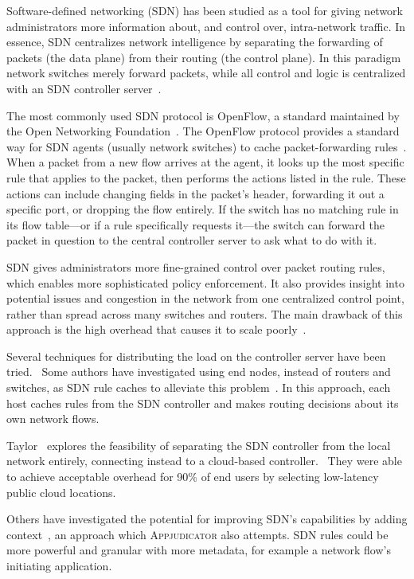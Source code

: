 Software-defined networking (SDN) has been studied as a tool for giving network
administrators more information about, and control over, intra-network traffic.
In essence, SDN centralizes network intelligence by separating the forwarding of
packets (the data plane) from their routing (the control plane). In this
paradigm network switches merely forward packets, while all control and logic is
centralized with an SDN controller server~\cite{kim2013}.

The most commonly used SDN protocol is OpenFlow, a standard maintained by the
Open Networking Foundation~\cite{erickson2011}. The OpenFlow protocol provides a
standard way for SDN agents (usually network switches) to cache
packet-forwarding rules~\cite{openflowspec}. When a packet from a new flow
arrives at the agent, it looks up the most specific rule that applies to the
packet, then performs the actions listed in the rule. These actions can include
changing fields in the packet's header, forwarding it out a specific port, or
dropping the flow entirely. If the switch has no matching rule in its flow
table---or if a rule specifically requests it---the switch can forward the
packet in question to the central controller server to ask what to do with it.

SDN gives administrators more fine-grained control over packet routing rules,
which enables more sophisticated policy enforcement. It also provides insight
into potential issues and congestion in the network from one centralized control
point, rather than spread across many switches and routers. The main drawback of
this approach is the high overhead that causes it to scale
poorly~\cite{benzekki2016}.

Several techniques for distributing the load on the controller server have been
tried.~\cite{oktian2017, dixit2013} Some authors have investigated using end
nodes, instead of routers and switches, as SDN rule caches to alleviate this
problem~\cite{taylor2017, chuluundorj2019}.  In this approach, each host caches
rules from the SDN controller and makes routing decisions about its own network
flows.

Taylor ~\etal explores the feasibility of separating the SDN controller from the
local network entirely, connecting instead to a cloud-based
controller.~\cite{taylor2017shue} They were able to achieve acceptable overhead
for 90\% of end users by selecting low-latency public cloud locations.

Others have investigated the potential for improving SDN's capabilities by
adding context~\cite{yang2015}, an approach which \textsc{Appjudicator} also
attempts. SDN rules could be more powerful and granular with more metadata, for
example a network flow's initiating application.

